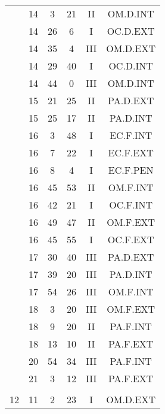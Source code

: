 \documentclass[12pt, a4paper]{article}
\begin{document}
\begin{multicols}{3}
{\begin{tabular}{c c c c c c}
	 	 	 	 & 14 & 3 & 21 & II & OM.D.INT\\%
	 	 	 	 & 14 & 26 & 6 & I & OC.D.EXT\\%
	 	 	 	 & 14 & 35 & 4 & III & OM.D.EXT\\%
	 	 	 	 & 14 & 29 & 40 & I & OC.D.INT\\%
	 	 	 	 & 14 & 44 & 0 & III & OM.D.INT\\%
	 	 	 	 & 15 & 21 & 25 & II & PA.D.EXT\\%
	 	 	 	 & 15 & 25 & 17 & II & PA.D.INT\\%
	 	 	 	 & 16 & 3 & 48 & I & EC.F.INT\\%
	 	 	 	 & 16 & 7 & 22 & I & EC.F.EXT\\%
	 	 	 	 & 16 & 8 & 4 & I & EC.F.PEN\\%
	 	 	 	 & 16 & 45 & 53 & II & OM.F.INT\\%
	 	 	 	 & 16 & 42 & 21 & I & OC.F.INT\\%
	 	 	 	 & 16 & 49 & 47 & II & OM.F.EXT\\%
	 	 	 	 & 16 & 45 & 55 & I & OC.F.EXT\\%
	 	 	 	 & 17 & 30 & 40 & III & PA.D.EXT\\%
	 	 	 	 & 17 & 39 & 20 & III & PA.D.INT\\%
	 	 	 	 & 17 & 54 & 26 & III & OM.F.INT\\%
	 	 	 	 & 18 & 3 & 20 & III & OM.F.EXT\\%
	 	 	 	 & 18 & 9 & 20 & II & PA.F.INT\\%
	 	 	 	 & 18 & 13 & 10 & II & PA.F.EXT\\%
	 	 	 	 & 20 & 54 & 34 & III & PA.F.INT\\%
	 	 	 	 & 21 & 3 & 12 & III & PA.F.EXT\\%
	 	 	 	 & & & & & \\%
	 	 	 	12 & 11 & 2 & 23 & I & OM.D.EXT\\%
	 	 \end{tabular}
 	}
\end{multicols}
\end{document}
